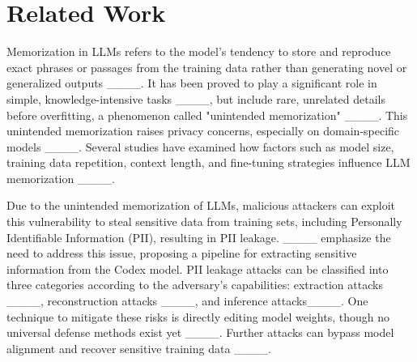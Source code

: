 \section{Related Work}
Memorization in LLMs refers to the model's tendency to store and reproduce exact phrases or passages from the training data rather than generating novel or generalized outputs ____. It has been proved to play a significant role in simple, knowledge-intensive tasks ____, but include rare, unrelated details before overfitting, a phenomenon called "unintended memorization" ____. This unintended memorization raises privacy concerns, especially on domain-specific models ____. Several studies have examined how factors such as model size, training data repetition, context length, and fine-tuning strategies influence LLM memorization ____.



Due to the unintended memorization of LLMs, malicious attackers can exploit this vulnerability to steal sensitive data from training sets, including Personally Identifiable Information (PII), resulting in PII leakage. ____ emphasize the need to address this issue, proposing a pipeline for extracting sensitive information from the Codex model. PII leakage attacks can be classified into three categories according to the adversary’s capabilities: extraction attacks ____, reconstruction attacks ____, and inference attacks____. One technique to mitigate these risks is directly editing model weights, though no universal defense methods exist yet ____. Further attacks can bypass model alignment and recover sensitive training data ____.